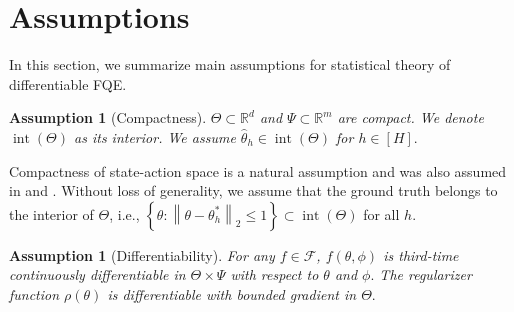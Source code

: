 \documentclass{article}
\def\mw#1{\textcolor{red}{mw:#1}}
\def\ruiqi#1{\text{\textcolor{blue}{Ruiqi Zhang:#1}}}
\numberwithin{equation}{section}
\theoremstyle{plain}
\theoremstyle{definition}
\newtheorem{assumption}[theorem]{Assumption}
\theoremstyle{remark}
\begin{document}
\section{Assumptions}

In this section, we summarize main assumptions for statistical theory of differentiable FQE.

\begin{assumption}[Compactness]\label{assumption_compact} \it
    $\Theta \subset \mathbb{R}^d$ and $\Psi \subset \mathbb{R}^m$ are compact. We denote $\operatorname{int}(\Theta)$ as its interior. We assume $\widehat{\theta}_h \in \operatorname{int}(\Theta)$ for $h \in [H].$
\end{assumption}

Compactness of state-action space is a natural assumption and was also assumed in \citep{bootstrap,duan2020minimax,hao2021sparse} and \citep{yang2020bridging}. Without loss of generality, we assume that the ground truth belongs to the interior of $\Theta$, i.e.,  $\left\{\theta: \left\|\theta - \theta_h^*\right\|_2 \leq 1\right\} \subset \operatorname{int}(\Theta)$ for all $h$.



\begin{assumption}[Differentiability]\label{assumption_differentiability} \it
    For any $f\in\mathcal{F}$, $f(\theta,\phi)$ is third-time continuously differentiable in $\Theta \times \Psi$ with respect to $\theta$ and $\phi.$ The regularizer function $\rho(\theta)$ is differentiable with bounded gradient in $\Theta.$ 
\end{assumption}
\end{document}
